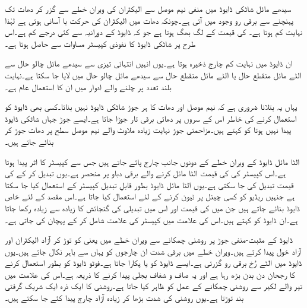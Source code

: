 سیدھے مائل شاٹکی ڈایوڈ میں منفی نیم موصل سے الیکٹران کی ویران خطے سے گزر کر دھات تک پہنچنے سے برقی رو وجود میں آتی ہے۔چونکہ دھات میں الیکٹران کی حرکت  با آسانی ہوتی ہے لہٰذا   نہایت کم ہوتا ہے۔ کی قیمت  کے لگ بھگ ہوتا ہے جو کہ  ڈایوڈ کے  دورانیہ سے کئی درجے کم ہے۔اس طرح  پر شاٹکی ڈایوڈ کا نفوذی کپیسٹر مساوات   سے  حاصل ہوتا  ہے۔  

ان ڈایوڈ میں نہایت کم چارج ذخیرہ ہوتا ہے۔یوں انہیں انتہائی تیزی سے سیدھے مائل چالو حال سے الٹے مائل منقطع حال یا الٹے مائل منقطع حال سے سیدھے مائل چالو حال میں لایا جا سکتا ہے۔نہایت بلند تعدد پر چلنے والے ادوار میں ان کا استعمال عام ہے۔   

یہاں یہ بتلانا ضروری ہے کہ نیم موصل اور دھات کا ہر جوڑ شاٹکی ڈایوڈ نہیں بناتا۔کسی بھی ڈایوڈ کو استعمال کرنے کی خاطر اس کے سروں پر دھاتی برقی تار جوڑا جاتا ہے۔ایسے جوڑ جہاں شاٹکی ڈایوڈ پیدا نہیں ہوتا کو   کہتے ہیں۔مزاحمتی جوڑ نہایت زیادہ ملاوٹ والے  نیم موصل سطح پر دھات جوڑ کر بنائے جاتے ہیں۔


الٹا مائل ڈایوڈ کے ویران خطے کے دونوں جانب چارج پائے جاتے ہیں جس سے کپیسٹر کا اثر پیدا ہوتا ہے۔اس کپیسٹر   کی کی قیمت الٹا مائل کرنے والے برقی دباو  پر منحصر ہے۔یوں  تبدیل کر کے   کی قیمت تبدیل کی جا سکتی ہے۔یوں الٹا مائل ڈایوڈ بطور قابلِ تبدیل کپیسٹر کے استعمال کیا جا سکتا ہے جنہیں ریڈیو کو کسی چینل پر ٹیون کرنے کے لئے استعمال کیا جاتا ہے۔اس مقصد کے لئے خاص ڈایوڈ بنائے جاتے ہیں جن میں  کی قیمت اور اس میں تبدیلی کی گنجائش کا زیادہ سے زیادہ رکھا جاتا ہے۔ان ڈایوڈ کو   کہتے ہیں۔اس کی علامت میں کپیسٹر کی علامت شامل کر کے پہچان کی جاتی ہے۔

ڈایوڈ کے مثبت-منفی جوڑ پر روشنی چمکانے سے ویران خطے میں   یعنی    کو توڑ کر آزاد الیکٹران اور آزاد خول پیدا کرتے ہیں۔ویران خطے میں برقی شدت ان چارجوں کو یہاں سے باہر نکال جاتے ہیں۔یوں ڈایوڈ میں الٹے رُخ برقی رو گزرتی ہے۔ایسے ڈایوڈ کو  یا  پکارا جاتا ہے۔فوٹو ڈایوڈ کو بطور  استعمال کرنے کا رجحان دن بدن بڑھ رہا ہے اور یہ صاف و شفاف بجلی پیدا کرنے کا ذریعہ ہے۔اس کی علامت میں تیر والے لکیر سے روشنی چمکانے کے عمل کو ظاہر کیا جاتا ہے۔روشنی کا ایک ذرہ  ایک شریک گرفتی بند توڑتا ہے۔یوں روشنی کی شدت بڑھا کر زیادہ آزاد چارج پیدا کئے جا سکتے ہیں۔

